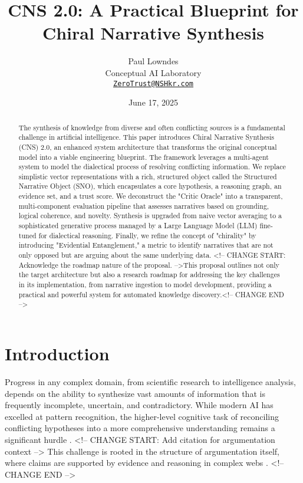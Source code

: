 \documentclass[12pt, a4paper]{article}
\title{\textbf{CNS 2.0: A Practical Blueprint for Chiral Narrative Synthesis}}
\author{
    Paul Lowndes \\
    \small Conceptual AI Laboratory \\
    \small \href{mailto:ZeroTrust@NSHkr.com}{\texttt{ZeroTrust@NSHkr.com}}
}
\date{June 17, 2025}
\begin{document}
\maketitle
\vspace{-2em}

\begin{abstract}
The synthesis of knowledge from diverse and often conflicting sources is a fundamental challenge in artificial intelligence. This paper introduces Chiral Narrative Synthesis (CNS) 2.0, an enhanced system architecture that transforms the original conceptual model into a viable engineering blueprint. The framework leverages a multi-agent system to model the dialectical process of resolving conflicting information. We replace simplistic vector representations with a rich, structured object called the Structured Narrative Object (SNO), which encapsulates a core hypothesis, a reasoning graph, an evidence set, and a trust score. We deconstruct the "Critic Oracle" into a transparent, multi-component evaluation pipeline that assesses narratives based on grounding, logical coherence, and novelty. Synthesis is upgraded from naive vector averaging to a sophisticated generative process managed by a Large Language Model (LLM) fine-tuned for dialectical reasoning. Finally, we refine the concept of "chirality" by introducing "Evidential Entanglement," a metric to identify narratives that are not only opposed but are arguing about the same underlying data. <!-- CHANGE START: Acknowledge the roadmap nature of the proposal. -->This proposal outlines not only the target architecture but also a research roadmap for addressing the key challenges in its implementation, from narrative ingestion to model development, providing a practical and powerful system for automated knowledge discovery.<!-- CHANGE END -->
\end{abstract}

\section{Introduction}
Progress in any complex domain, from scientific research to intelligence analysis, depends on the ability to synthesize vast amounts of information that is frequently incomplete, uncertain, and contradictory. While modern AI has excelled at pattern recognition, the higher-level cognitive task of reconciling conflicting hypotheses into a more comprehensive understanding remains a significant hurdle \cite{Boström2017}. <!-- CHANGE START: Add citation for argumentation context --> This challenge is rooted in the structure of argumentation itself, where claims are supported by evidence and reasoning in complex webs \cite{Toulmin2003}. <!-- CHANGE END -->
\end{document}
